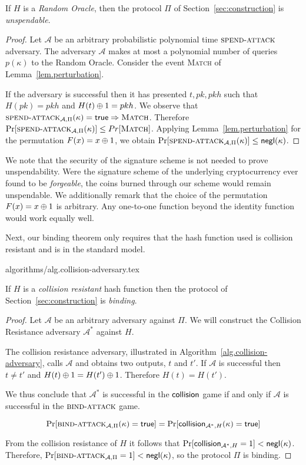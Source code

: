 \begin{theorem}[Unspendability]
  If $H$ is a \emph{Random Oracle}, then the protocol $\Pi$ of Section~\ref{sec:construction} is \emph{unspendable}.
\end{theorem}
\begin{proof}
  Let $\mathcal{A}$ be an arbitrary probabilistic polynomial time $\textsc{spend}\-\text{-}\-\textsc{attack}$ adversary.
  The adversary $\mathcal{A}$ makes at most a polynomial number of queries $p(\kappa)$ to the Random Oracle.
  Consider the event \textsc{Match} of Lemma~\ref{lem.perturbation}.

  If the adversary is successful then it has presented $t, pk, pkh$ such that $H(pk) = pkh$ and $H(t) \oplus 1 = pkh$.
  We observe that $\textsc{spend}\-\text{-}\-\textsc{attack}_{\mathcal{A}, \Pi}(\kappa) = \mathsf{true} \Rightarrow \textsc{Match}$.
  Therefore $\Pr[\textsc{spend}\-\text{-}\-\textsc{attack}_{\mathcal{A}, \Pi}(\kappa)] \leq Pr[\textsc{Match}]$. Applying Lemma~\ref{lem.perturbation} for the permutation $F(x) = x \oplus 1$,
  we obtain
  $\Pr[\textsc{spend}\-\text{-}\-\textsc{attack}_{\mathcal{A}, \Pi}(\kappa)] \leq \textsf{negl}(\kappa)$.
\end{proof}

We note that the security of the signature scheme is not needed to prove unspendability. Were the signature scheme of the underlying cryptocurrency ever found to be \emph{forgeable}, the coins burned through our scheme would remain unspendable. We additionally remark that the
choice of the permutation $F(x) = x \oplus 1$ is arbitrary. Any one-to-one
function beyond the identity function would work equally well.

Next, our binding theorem only requires that the hash function used is collision
resistant and is in the standard model.

{algorithms/alg.collision-adversary.tex}

\begin{theorem}[Binding]
  If $H$ is a \emph{collision resistant} hash function then the protocol of Section~\ref{sec:construction} is \emph{binding}.
\end{theorem}
\begin{proof}
  Let $\mathcal{A}$ be an arbitrary adversary against $\Pi$.
  We will construct the Collision Resistance adversary $\mathcal{A}^*$ against $H$.

  The collision resistance adversary, illustrated in Algorithm~\ref{alg.collision-adversary}, calls $\mathcal{A}$ and obtains two outputs, $t$ and $t'$. If $\mathcal{A}$ is successful then $t \neq t'$ and $H(t) \oplus 1 = H(t') \oplus 1$. Therefore $H(t) = H(t')$.

  We thus conclude that $\mathcal{A^*}$ is successful in the $\textsf{collision}$ game if and only if $\mathcal{A}$ is successful in the $\textsc{bind}\-\text{-}\-\textsc{attack}$ game.

  \[
    \Pr[\textsc{bind}\-\text{-}\-\textsc{attack}_{\mathcal{A},\Pi}(\kappa) = \mathsf{true}]
    =
    \Pr[\textsf{collision}_{\mathcal{A}^*,H}(\kappa) = \mathsf{true}]
  \]

  From the collision resistance of $H$ it follows that $\Pr[\textsf{collision}_{\mathcal{A}^*,H} = 1] < \textsf{negl}(\kappa)$. Therefore,
  $\Pr[\textsc{bind}\-\text{-}\-\textsc{attack}_{\mathcal{A},\Pi} = 1] < \textsf{negl}(\kappa)$, so
  the protocol $\Pi$ is binding.
\end{proof}

